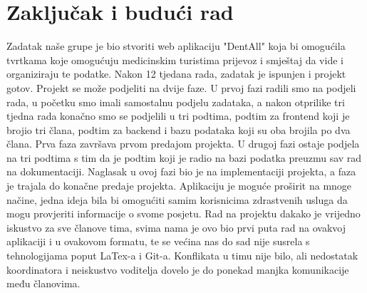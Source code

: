 \chapter{Zaključak i budući rad}
		
		
		 
		 Zadatak naše grupe je bio stvoriti web aplikaciju "DentAll" koja bi omogućila tvrtkama koje omogućuju medicinskim turistima prijevoz i smještaj da vide i organiziraju te podatke. Nakon 12 tjedana rada, zadatak je ispunjen i projekt gotov. %
		 \newline Projekt se može podjeliti na dvije faze. U prvoj fazi radili smo na podjeli rada, u početku smo imali samostalnu podjelu zadataka, a nakon otprilike tri tjedna rada konačno smo se podjelili u tri podtima, podtim za frontend koji je brojio tri člana, podtim za backend i bazu podataka koji su oba brojila po dva člana. Prva faza završava prvom predajom projekta.
		 \newline
		 U drugoj fazi ostaje podjela na tri podtima s tim da je podtim koji je radio na bazi podatka preuzmu sav rad na dokumentaciji. Naglasak u ovoj fazi bio je na implementaciji projekta, a faza je trajala do konačne predaje projekta.
		 \newline
		 Aplikaciju je moguće proširit na mnoge načine, jedna ideja bila bi omogućiti samim korisnicima zdrastvenih usluga da mogu provjeriti informacije o svome posjetu. Rad na projektu dakako je vrijedno iskustvo za sve članove tima, svima nama je ovo bio prvi puta rad na ovakvoj aplikaciji i u ovakovom formatu, te se većina nas do sad nije susrela s tehnologijama poput LaTex-a i Git-a. Konflikata u timu nije bilo, ali nedostatak koordinatora i neiskustvo voditelja dovelo je do ponekad manjka komunikacije među članovima.
		
		
		\eject 